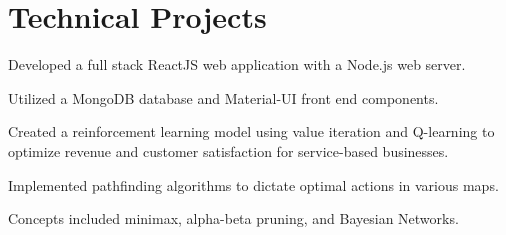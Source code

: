 \documentclass[]{deedy-resume-openfont}
\begin{document}
\begin{minipage}[t]{0.66\textwidth}

\section{Technical Projects}
\begin{tightemize}
    \item Developed a full stack ReactJS web application with a Node.js web server.
    \item Utilized a MongoDB database and Material-UI front end components.
\end{tightemize}
\sectionsep


\begin{tightemize}
    \item Created a reinforcement learning model using value iteration and Q-learning to optimize revenue and customer satisfaction for service-based businesses.
\end{tightemize}
\sectionsep

\begin{tightemize}
    \item Implemented pathfinding algorithms to dictate optimal actions in various maps.
    \item Concepts included minimax, alpha-beta pruning, and Bayesian Networks.
\end{tightemize}
\sectionsep


\end{minipage}
\end{document}
